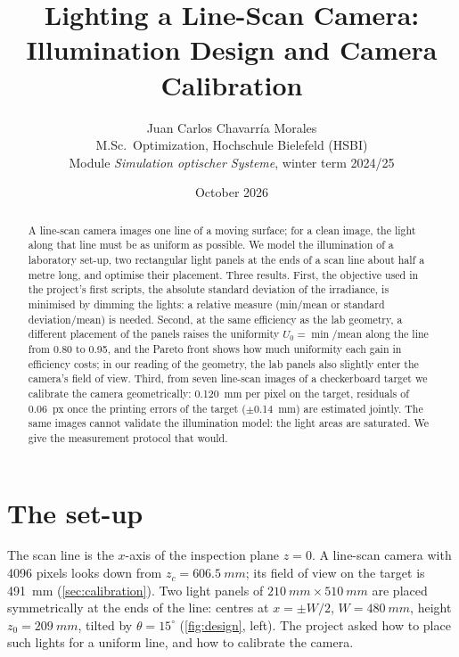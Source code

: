 \documentclass[11pt,a4paper]{article}
\title{Lighting a Line-Scan Camera:\\ Illumination Design and Camera Calibration}
\author{Juan Carlos Chavarr\'ia Morales\\[2pt]
  \small M.Sc.\ Optimization, Hochschule Bielefeld (HSBI)\\
  \small Module \emph{Simulation optischer Systeme}, winter term 2024/25}
\date{October 2026}
\begin{document}
\maketitle

\begin{abstract}
A line-scan camera images one line of a moving surface; for a clean image, the light along that line must be as
uniform as possible. We model the illumination of a laboratory set-up, two rectangular light panels at the ends of
a scan line about half a metre long, and optimise their placement. Three results. First, the objective used in the
project's first scripts, the absolute standard deviation of the irradiance, is minimised by dimming the lights: a
relative measure (min/mean or standard deviation/mean) is needed. Second, at the same efficiency as the lab
geometry, a different placement of the panels raises the uniformity $U_0 = \min/\text{mean}$ along the line from
0.80 to 0.95, and the Pareto front shows how much uniformity each gain in efficiency costs; in our reading of the
geometry, the lab panels also slightly enter the camera's field of view. Third, from seven line-scan images of a
checkerboard target we calibrate the camera geometrically: \SI{0.120}{mm} per pixel on the target, residuals of
\SI{0.06}{px} once the printing errors of the target ($\pm$\SI{0.14}{mm}) are estimated jointly. The same images
cannot validate the illumination model: the light areas are saturated. We give the measurement protocol that
would.
\end{abstract}

\section{The set-up}

The scan line is the $x$-axis of the inspection plane $z = 0$. A line-scan camera with 4096 pixels looks down from
$z_c = \SI{606.5}{mm}$; its field of view on the target is \SI{491}{mm} (\cref{sec:calibration}). Two light panels
of $\SI{210}{mm} \times \SI{510}{mm}$ are placed symmetrically at the ends of the line: centres at $x = \pm W/2$,
$W = \SI{480}{mm}$, height $z_0 = \SI{209}{mm}$, tilted by $\theta = 15^\circ$ (\cref{fig:design}, left).
The project asked how to place such lights for a uniform line, and how to calibrate the camera.

\end{document}

